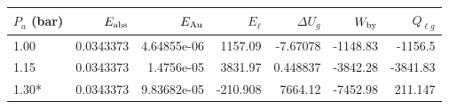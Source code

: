 \begin{tabular}{lrrrrrr}\toprule
$P_a$ (bar) & $E_{\rm abs}$ & $E_{\rm Au}$ & $E_\ell$ & $\Delta U_g$ & $W_{\rm by}$ & $Q_{\ell g}$ \\ \midrule
1.00 & 0.0343373 & 4.64855e-06 & 1157.09 & -7.67078 & -1148.83 & -1156.5 \\
1.15 & 0.0343373 & 1.4756e-05 & 3831.97 & 0.448837 & -3842.28 & -3841.83 \\
1.30* & 0.0343373 & 9.83682e-05 & -210.908 & 7664.12 & -7452.98 & 211.147 \\
\bottomrule\end{tabular}
